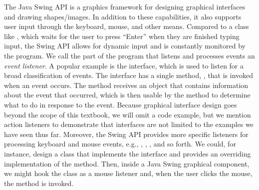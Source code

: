 The Java Swing API is a graphics framework for designing graphical interfaces and drawing shapes/images. In addition to these capabilities, it also supports user input through the keyboard, mouse, and other means. Compared to a class like , which waits for the user to press ``Enter'' when they are finished typing input, the Swing API allows for dynamic input and is constantly monitored by the program. We call the part of the program that listens and processes events an \textit{event listener}. A popular example is the  interface, which is used to listen for a broad classification of events. The  interface has a single method, , that is invoked when an event occurs. The  method receives an  object that contains information about the event that occurred, which is then usable by the method to determine what to do in response to the event. Because graphical interface design goes beyond the scope of this textbook, we will omit a code example, but we mention action listeners to demonstrate that interfaces are not limited to the examples we have seen thus far. Moreover, the Swing API provides more specific listeners for processing keyboard and mouse events, e.g., , , , and so forth. We could, for instance, design a class that implements the  interface and provides an overriding implementation of the  method. Then, inside a Java Swing graphical component, we might hook the class as a mouse listener and, when the user clicks the mouse, the  method is invoked.